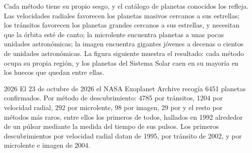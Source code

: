 Cada método tiene su propio sesgo, y el catálogo de planetas conocidos los refleja.
Las velocidades radiales favorecen los planetas masivos cercanos a sus estrellas;
los tránsitos favorecen los planetas grandes cercanos a sus estrellas, y necesitan que la órbita esté de canto;
la microlente encuentra planetas a unas pocas unidades astronómicas;
la imagen encuentra gigantes jóvenes a decenas o cientos de unidades astronómicas.
La figura siguiente muestra el resultado: cada método ocupa su propia región, y los planetas del Sistema Solar
caen en su mayoría en los huecos que quedan entre ellas.

\begin{dated}{2026}
El 23 de octubre de 2026 el NASA Exoplanet Archive
recogía 6451 planetas confirmados. Por método de descubrimiento: 4785 por tránsitos, 1204 por
velocidad radial, 292 por microlente, 98 por imagen, 29 por 
y el resto por métodos más raros, entre ellos los primeros de todos, hallados en 1992 alrededor
de un púlsar mediante la medida del tiempo de sus pulsos. Los primeros descubrimientos
por velocidad radial datan de 1995, por tránsito de 2002,
y por microlente e imagen de 2004.
\end{dated}

